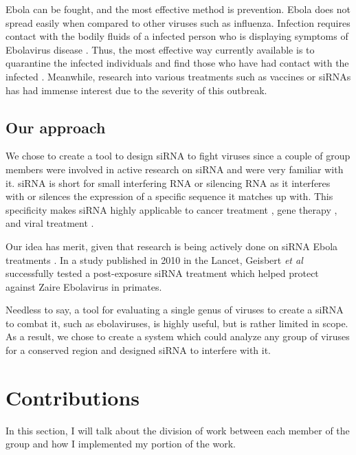 \documentclass[10pt,letterpaper]{article}
\begin{document}
Ebola can be fought, and the most effective method is prevention.
Ebola does not spread easily when compared to other viruses such as influenza.
Infection requires contact with the bodily fluids of a infected person who is displaying symptoms of Ebolavirus disease \cite{wongcharacterization} \cite{team2014ebola}.
Thus, the most effective way currently available is to quarantine the infected individuals and find those who have had contact with the infected \cite{team2014ebola}.
Meanwhile, research into various treatments such as vaccines \cite{geisbert2015emergency} or siRNAs \cite{lipid} has had immense interest due to the severity of this outbreak.


\subsection{Our approach}
We chose to create a tool to design siRNA to fight viruses since a couple of group members were involved in active research on siRNA and were very familiar with it.
siRNA is short for small interfering RNA or silencing RNA as it interferes with or silences the expression of a specific sequence it matches up with.
This specificity makes siRNA highly applicable to cancer treatment \cite{chen2010noparticles}, gene therapy \cite{kim2006peg}, and viral treatment \cite{gitlin2002short}.


Our idea has merit, given that research is being actively done on siRNA Ebola treatments \cite{lipid} \cite{kugelman2015evaluation} \cite{geisbert2010postexposure}.
In a study published in 2010 in the Lancet, Geisbert \textit{et al} \cite{geisbert2010postexposure} successfully tested a post-exposure siRNA treatment which helped protect against Zaire Ebolavirus in primates.

Needless to say, a tool for evaluating a single genus of viruses to create a siRNA to combat it, such as ebolaviruses, is highly useful, but is rather limited in scope.
As a result, we chose to create a system which could analyze any group of viruses for a conserved region and designed siRNA to interfere with it.

\section{Contributions}

In this section, I will talk about the division of work between each member of the group and how I implemented my portion of the work.
\end{document}
